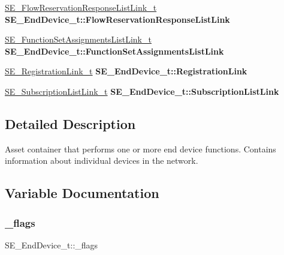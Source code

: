 \begin{DoxyCompactItemize}
\item 
\mbox{\label{group__EndDevice_ga4945e7ff083f929b5c6c9d72a323877d}} 
\hyperlink{structSE__FlowReservationResponseListLink__t}{S\+E\+\_\+\+Flow\+Reservation\+Response\+List\+Link\+\_\+t} {\bfseries S\+E\+\_\+\+End\+Device\+\_\+t\+::\+Flow\+Reservation\+Response\+List\+Link}
\item 
\mbox{\label{group__EndDevice_ga42255e0483e6444fe22c587352906608}} 
\hyperlink{structSE__FunctionSetAssignmentsListLink__t}{S\+E\+\_\+\+Function\+Set\+Assignments\+List\+Link\+\_\+t} {\bfseries S\+E\+\_\+\+End\+Device\+\_\+t\+::\+Function\+Set\+Assignments\+List\+Link}
\item 
\mbox{\label{group__EndDevice_gae64673381089210a9170983101c20ada}} 
\hyperlink{structSE__RegistrationLink__t}{S\+E\+\_\+\+Registration\+Link\+\_\+t} {\bfseries S\+E\+\_\+\+End\+Device\+\_\+t\+::\+Registration\+Link}
\item 
\mbox{\label{group__EndDevice_gad4e13cc27c509a414e54ceb3008fd536}} 
\hyperlink{structSE__SubscriptionListLink__t}{S\+E\+\_\+\+Subscription\+List\+Link\+\_\+t} {\bfseries S\+E\+\_\+\+End\+Device\+\_\+t\+::\+Subscription\+List\+Link}
\end{DoxyCompactItemize}


\subsection{Detailed Description}
Asset container that performs one or more end device functions. Contains information about individual devices in the network. 

\subsection{Variable Documentation}
\mbox{\label{group__EndDevice_ga11e4a5d3538ec472aa2342848487245d}} 
\subsubsection{\texorpdfstring{\+\_\+flags}{\_flags}}
{\footnotesize\ttfamily S\+E\+\_\+\+End\+Device\+\_\+t\+::\+\_\+flags}

